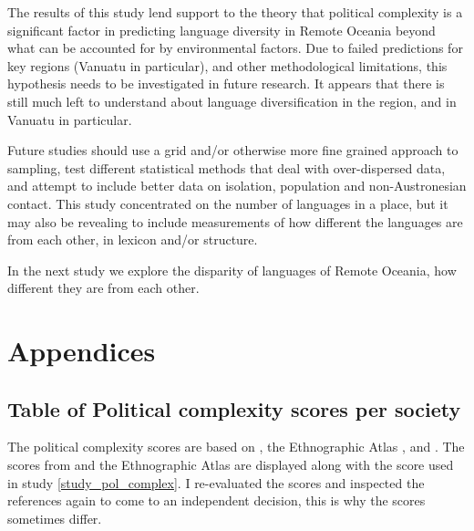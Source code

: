 \documentclass[a4paper,10pt]{article} %
\begin{document}
The results of this study lend support to the theory that political complexity is a significant factor in predicting language diversity in Remote Oceania beyond what can be accounted for by environmental factors. Due to failed predictions for key regions (Vanuatu in particular), and other methodological limitations, this hypothesis needs to be investigated in future research. It appears that there is still much left to understand about language diversification in the region, and in Vanuatu in particular.

Future studies should use a grid and/or otherwise more fine grained approach to sampling, test different statistical methods that deal with over-dispersed data, and attempt to include better data on isolation, population and non-Austronesian contact. This study concentrated on the number of languages in a place, but it may also be revealing to include measurements of how different the languages are from each other, in lexicon and/or structure.

In the next study we explore the disparity of languages of Remote Oceania, how different they are from each other.



\newpage



\newpage
\singlespacing




\newpage
\singlespacing
\appendix
\section*{Appendices}
\renewcommand{\thesubsection}{\Alph{subsection}}



\subsection{Table of Political complexity scores per society}
\label{Pol_complex_table}
\singlespacing
The political complexity scores are based on \cite{sheehan2018coevolution}, the Ethnographic Atlas  \citep{d_place_all},\citet{bonnemaison1972systeme} and \cite{bonnemaison1996graded}. The scores from  \cite{sheehan2018coevolution} and the Ethnographic Atlas are displayed along with the score used in study \ref{study_pol_complex}. I re-evaluated the scores and inspected the references again to come to an independent decision, this is why the scores sometimes differ.
\end{document}
